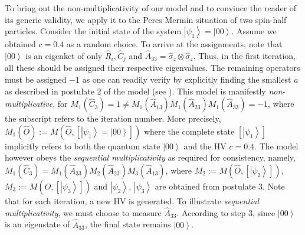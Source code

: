 \documentclass[british,aps,prl,superscriptaddress,nofootinbib,times,reprint]{revtex4-1}
\theoremstyle{plain}
\theoremstyle{plain}
\theoremstyle{definition}
\theoremstyle{remark}
\theoremstyle{remark}
\theoremstyle{remark}
\theoremstyle{plain}
\theoremstyle{plain}
\theoremstyle{plain}
\theoremstyle{definition}
\theoremstyle{definition}
\begin{document}
To bring out the non-multiplicativity of our model 
and to convince the reader of its generic validity,
we apply it to the Peres Mermin situation of two
spin-half particles. Consider the initial state of
the system 
$\left|\psi_{1}\right\rangle
=\left|00\right\rangle $. Assume we 
obtained $c=0.4$ as a random choice. To arrive
at the assignments, note that
$\left|00\right\rangle $ is an eigenket of only
$\hat{R}_{i},\hat{C}_{j}$ and
$\hat{A}_{33}=\hat{\sigma}_{z}\otimes\hat{\sigma}_{z}$.
Thus, in the first iteration, all these should be
assigned their respective eigenvalues. The
remaining operators must be assigned $-1$ as one
can readily verify by explicitly finding the
smallest $a$ as described in postulate 2 of the
model (see ). 
This model is manifestly
\emph{non-multiplicative}, for
$M_{1}(\hat{C}_{3})=1\neq
M_{1}(\hat{A}_{13})M_{1}(\hat{A}_{23})M_{1}(\hat{A}_{33})=-1$,
where the subscript refers to the iteration
number.
More precisely,
$M_{1}(\hat{O}):=M(\hat{O},\left[\left|\psi_{1}\right\rangle
=\left|00\right\rangle \right])$ where the
complete state $\left[\left|\psi_{1}\right\rangle
\right]$ implicitly refers to both the quantum
state $\left|00\right\rangle $ and the HV $c=0.4$.
The model however  obeys the \emph{sequential
multiplicativity} as required for consistency,
namely,
$M_{1}(\hat{C}_{3})=M_{1}(\hat{A}_{33})M_{2}(\hat{A}_{23})M_{3}(\hat{A}_{13})$,
where
$M_{2}:=M(\hat{O},\left[\left|\psi_{2}\right\rangle
\right])$,
$M_{3}:=M(\hat{O},\left[\left|\psi_{3}\right\rangle
\right])$ and $\left|\psi_{2}\right\rangle
,\,\left|\psi_{3}\right\rangle $ are obtained from
postulate 3. Note that for each iteration, a new
HV is generated. To illustrate \emph{sequential
multiplicativity}, we must choose to measure
$\hat{A}_{33}$. According to step 3, since
$\left|00\right\rangle $ is an eigenstate of
$\hat{A}_{33}$, the final state remains
$\left|00\right\rangle $.  
\end{document}
